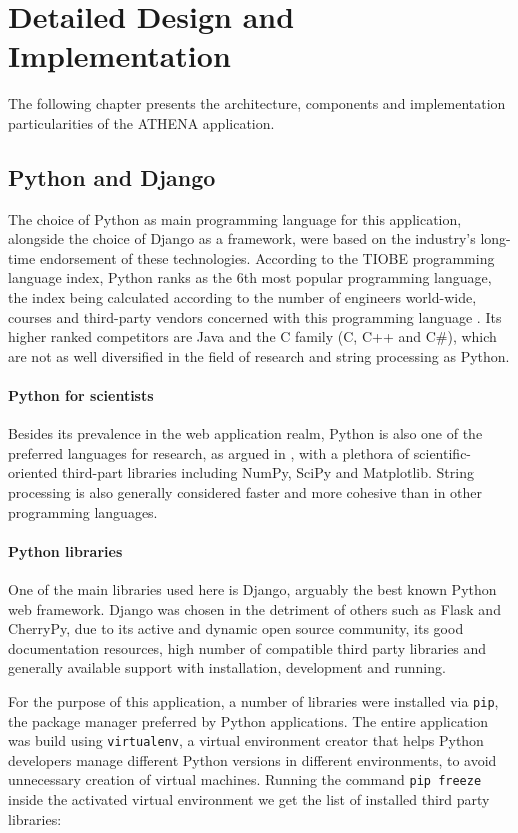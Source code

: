 \chapter{Detailed Design and Implementation}
\label{ch5l}
The following chapter presents the architecture, components and implementation particularities of the ATHENA application.

\section{Python and Django}
The choice of Python as main programming language for this application, alongside the choice of Django as a framework, were based on the industry's long-time endorsement of these technologies. According to the TIOBE programming language index, Python ranks as the 6th most popular programming language, the index being calculated according to the number of engineers world-wide, courses and third-party vendors concerned with this programming language \cite{tiobeindex}. Its higher ranked competitors are Java and the C family (C, C++ and C\#), which are not as well diversified in the field of research and string processing as Python.

\subsubsection{Python for scientists}
Besides its prevalence in the web application realm, Python is also one of the preferred languages for research, as argued in \cite{millman2011python}, with a plethora of scientific-oriented third-part libraries including NumPy, SciPy and Matplotlib. String processing is also generally considered faster and more cohesive than in other programming languages.

\subsubsection{Python libraries}
One of the main libraries used here is Django, arguably the best known Python web framework. Django was chosen in the detriment of others such as Flask and CherryPy, due to its active and dynamic open source community, its good documentation resources, high number of compatible third party libraries and generally available support with installation, development and running.

For the purpose of this application, a number of libraries were installed via \texttt{pip}, the package manager preferred by Python applications. The entire application was build using \texttt{virtualenv}, a virtual environment creator that helps Python developers manage different Python versions in different environments, to avoid unnecessary creation of virtual machines. Running the command \texttt{pip freeze} inside the activated virtual environment we get the list of installed third party libraries:

